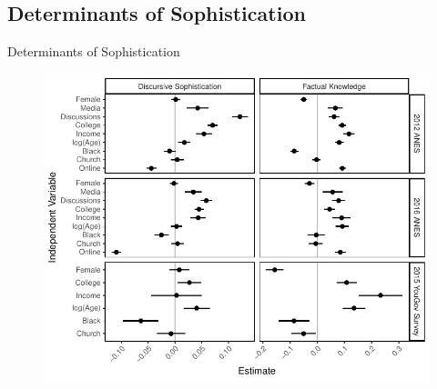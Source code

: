 \subsection{Determinants of Sophistication}
\begin{frame}{Determinants of Sophistication}
\begin{figure}
	\includegraphics[height=.9\textheight]{../fig/determinants.pdf}
\end{figure}
\end{frame}

